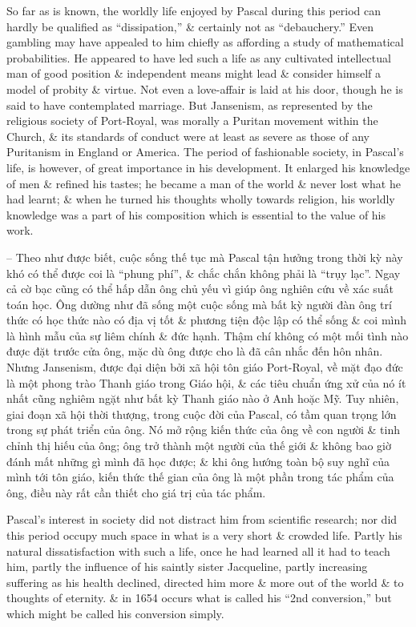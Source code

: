 \documentclass{article}
\begin{document}
\begin{enumerate}
\begin{itemize}
		So far as is known, the worldly life enjoyed by {\sc Pascal} during this period can hardly be qualified as ``dissipation,'' \& certainly not as ``debauchery.'' Even gambling may have appealed to him chiefly as affording a study of mathematical probabilities. He appeared to have led such a life as any cultivated intellectual man of good position \& independent means might lead \& consider himself a model of probity \& virtue. Not even a love-affair is laid at his door, though he is said to have contemplated marriage. But Jansenism, as represented by the religious society of Port-Royal, was morally a Puritan movement within the Church, \& its standards of conduct were at least as severe as those of any Puritanism in England or America. The period of fashionable society, in {\sc Pascal}'s life, is however, of great importance in his development. It enlarged his knowledge of men \& refined his tastes; he became a man of the world \& never lost what he had learnt; \& when he turned his thoughts wholly towards religion, his worldly knowledge was a part of his composition which is essential to the value of his work.
		
		-- Theo như được biết, cuộc sống thế tục mà {\sc Pascal} tận hưởng trong thời kỳ này khó có thể được coi là ``phung phí'', \& chắc chắn không phải là ``trụy lạc''. Ngay cả cờ bạc cũng có thể hấp dẫn ông chủ yếu vì giúp ông nghiên cứu về xác suất toán học. Ông dường như đã sống một cuộc sống mà bất kỳ người đàn ông trí thức có học thức nào có địa vị tốt \& phương tiện độc lập có thể sống \& coi mình là hình mẫu của sự liêm chính \& đức hạnh. Thậm chí không có một mối tình nào được đặt trước cửa ông, mặc dù ông được cho là đã cân nhắc đến hôn nhân. Nhưng Jansenism, được đại diện bởi xã hội tôn giáo Port-Royal, về mặt đạo đức là một phong trào Thanh giáo trong Giáo hội, \& các tiêu chuẩn ứng xử của nó ít nhất cũng nghiêm ngặt như bất kỳ Thanh giáo nào ở Anh hoặc Mỹ. Tuy nhiên, giai đoạn xã hội thời thượng, trong cuộc đời của {\sc Pascal}, có tầm quan trọng lớn trong sự phát triển của ông. Nó mở rộng kiến thức của ông về con người \& tinh chỉnh thị hiếu của ông; ông trở thành một người của thế giới \& không bao giờ đánh mất những gì mình đã học được; \& khi ông hướng toàn bộ suy nghĩ của mình tới tôn giáo, kiến thức thế gian của ông là một phần trong tác phẩm của ông, điều này rất cần thiết cho giá trị của tác phẩm.
		
		{\sc Pascal}'s interest in society did not distract him from scientific research; nor did this period occupy much space in what is a very short \& crowded life. Partly his natural dissatisfaction with such a life, once he had learned all it had to teach him, partly the influence of his saintly sister {\sc Jacqueline}, partly increasing suffering as his health declined, directed him more \& more out of the world \& to thoughts of eternity. \& in 1654 occurs what is called his ``2nd conversion,'' but which might be called his conversion simply.
		

\end{itemize}
\end{enumerate}
\end{document}
